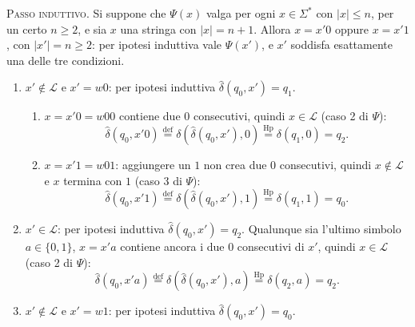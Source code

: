 \documentclass[a4paper, 11pt, oneside]{book}
\theoremstyle{formale}
\begin{document}
    \textsc{Passo induttivo}. Si suppone che $\Psi(x)$ valga per ogni $x \in \Sigma^*$ con
    $|x| \leq n$, per un certo $n \geq 2$, e sia $x$ una stringa con $|x| = n + 1$. Allora
    $x = x'0$ oppure $x = x'1$, con $|x'| = n \geq 2$: per ipotesi induttiva vale
    $\Psi(x')$, e $x'$ soddisfa esattamente una delle tre condizioni.
    \begin{enumerate}
        \item $x' \notin \mathcal{L}$ e $x' = w0$: per ipotesi induttiva
            $\hat{\delta}(q_0, x') = q_1$.
            \begin{enumerate}[label=\arabic{enumi}\alph*.]
                \item $x = x'0 = w00$ contiene due $0$ consecutivi, quindi
                    $x \in \mathcal{L}$ (caso 2 di $\Psi$):
                    \begin{equation*}
                        \hat{\delta}(q_0, x'0)
                        \overset{\text{def}}{=} \delta(\hat{\delta}(q_0, x'), 0)
                        \overset{\text{Hp}}{=} \delta(q_1, 0) = q_2.
                    \end{equation*}
                \item $x = x'1 = w01$: aggiungere un $1$ non crea due $0$ consecutivi,
                    quindi $x \notin \mathcal{L}$ e $x$ termina con $1$ (caso 3 di $\Psi$):
                    \begin{equation*}
                        \hat{\delta}(q_0, x'1)
                        \overset{\text{def}}{=} \delta(\hat{\delta}(q_0, x'), 1)
                        \overset{\text{Hp}}{=} \delta(q_1, 1) = q_0.
                    \end{equation*}
            \end{enumerate}
        \item $x' \in \mathcal{L}$: per ipotesi induttiva $\hat{\delta}(q_0, x') = q_2$.
            Qualunque sia l'ultimo simbolo $a \in \{0, 1\}$, $x = x'a$ contiene ancora i due
            $0$ consecutivi di $x'$, quindi $x \in \mathcal{L}$ (caso 2 di $\Psi$):
            \begin{equation*}
                \hat{\delta}(q_0, x'a)
                \overset{\text{def}}{=} \delta(\hat{\delta}(q_0, x'), a)
                \overset{\text{Hp}}{=} \delta(q_2, a) = q_2.
            \end{equation*}
        \item $x' \notin \mathcal{L}$ e $x' = w1$: per ipotesi induttiva
            $\hat{\delta}(q_0, x') = q_0$.
            \begin{enumerate}[label=\arabic{enumi}\alph*.]

\end{enumerate}
\end{enumerate}
\end{document}
